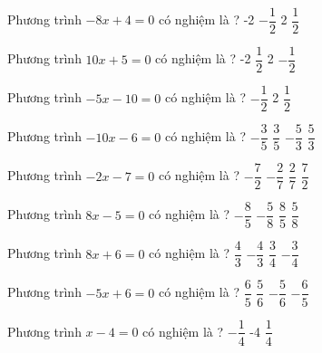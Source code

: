 \begin{ex} 
	Phương trình $-8x+4=0$ có nghiệm là ? 
	\choice
	{-2}
	{$- \dfrac{ 1 }{ 2 } $}
	{2}
	{\True $ \dfrac{ 1 }{ 2 } $}
	\loigiai{} 
\end{ex}

\begin{ex} 
	Phương trình $10x+5=0$ có nghiệm là ? 
	\choice
	{-2}
	{$ \dfrac{ 1 }{ 2 } $}
	{2}
	{\True $- \dfrac{ 1 }{ 2 } $}
	\loigiai{} 
\end{ex}

\begin{ex} 
	Phương trình $-5x-10=0$ có nghiệm là ? 
	\choice
	{$- \dfrac{ 1 }{ 2 } $}
	{}
	{2}
	{$ \dfrac{ 1 }{ 2 } $}
	\loigiai{} 
\end{ex}

\begin{ex} 
	Phương trình $-10x-6=0$ có nghiệm là ? 
	\choice
	{\True $- \dfrac{ 3 }{ 5 } $}
	{$ \dfrac{ 3 }{ 5 } $}
	{$- \dfrac{ 5 }{ 3 } $}
	{$ \dfrac{ 5 }{ 3 } $}
	\loigiai{} 
\end{ex}

\begin{ex} 
	Phương trình $-2x-7=0$ có nghiệm là ? 
	\choice
	{\True $- \dfrac{ 7 }{ 2 } $}
	{$- \dfrac{ 2 }{ 7 } $}
	{$ \dfrac{ 2 }{ 7 } $}
	{$ \dfrac{ 7 }{ 2 } $}
	\loigiai{} 
\end{ex}

\begin{ex} 
	Phương trình $8x-5=0$ có nghiệm là ? 
	\choice
	{$- \dfrac{ 8 }{ 5 } $}
	{$- \dfrac{ 5 }{ 8 } $}
	{$ \dfrac{ 8 }{ 5 } $}
	{\True $ \dfrac{ 5 }{ 8 } $}
	\loigiai{} 
\end{ex}

\begin{ex} 
	Phương trình $8x+6=0$ có nghiệm là ? 
	\choice
	{$ \dfrac{ 4 }{ 3 } $}
	{$- \dfrac{ 4 }{ 3 } $}
	{$ \dfrac{ 3 }{ 4 } $}
	{\True $- \dfrac{ 3 }{ 4 } $}
	\loigiai{} 
\end{ex}

\begin{ex} 
	Phương trình $-5x+6=0$ có nghiệm là ? 
	\choice
	{\True $ \dfrac{ 6 }{ 5 } $}
	{$ \dfrac{ 5 }{ 6 } $}
	{$- \dfrac{ 5 }{ 6 } $}
	{$- \dfrac{ 6 }{ 5 } $}
	\loigiai{} 
\end{ex}

\begin{ex} 
	Phương trình $x-4=0$ có nghiệm là ? 
	\choice
	{}
	{$- \dfrac{ 1 }{ 4 } $}
	{-4}
	{$ \dfrac{ 1 }{ 4 } $}
	\loigiai{} 
\end{ex}

